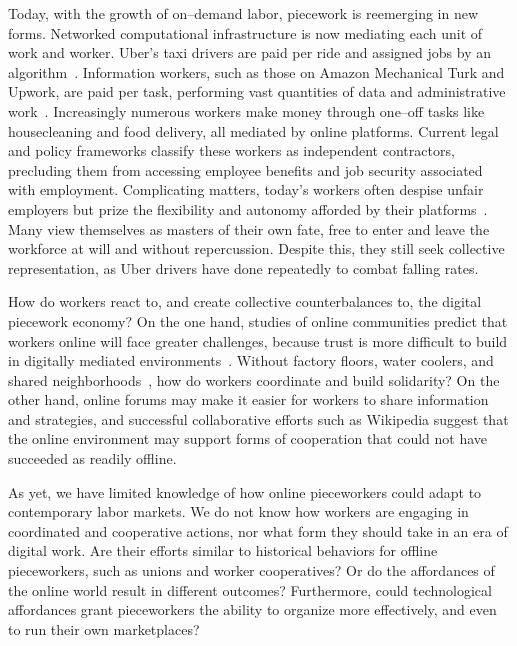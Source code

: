 \documentclass{article}
\newcommand{\topic}[1]{{\color{Blue}#1}} %
\begin{document}
\topic{Today, with the growth of on--demand labor, piecework is reemerging in new forms.}
Networked computational infrastructure is now mediating each unit of work and worker.
Uber's taxi drivers are paid per ride and assigned jobs by an algorithm~\cite{uberAlgorithm,hall2015analysis}.
Information workers, such as those on Amazon Mechanical Turk and Upwork, are paid per task, performing vast quantities of data and administrative work~\cite{martin2014being}.
Increasingly numerous workers make money through one--off tasks like housecleaning and food delivery, all mediated by online platforms.
Current legal and policy frameworks classify these workers as independent contractors, precluding them from accessing employee benefits and job security associated with employment.
Complicating matters, today's workers often despise unfair employers but prize the flexibility and autonomy afforded by their platforms~\cite{martin2014being}.
Many view themselves as masters of their own fate, free to enter and leave the workforce at will and without repercussion.
Despite this, they still seek collective representation, as Uber drivers have done repeatedly to combat falling rates.

\topic{How do workers react to, and create collective counterbalances to, the digital piecework economy?}
On the one hand, studies of online communities predict that workers online will face greater challenges, because
trust is more difficult to build in digitally mediated environments~\cite{successfulOnlineCommunities,kollock2005managing,cook2005cooperation}.
Without factory floors, water coolers, and shared neighborhoods~\cite{waterCooler},
how do workers coordinate and build solidarity?
On the other hand,
online forums may make it easier for workers to share information and strategies,
and successful collaborative efforts such as Wikipedia suggest that the online environment may support forms of cooperation that could not have succeeded as readily offline.

\topic{As yet,
we have limited knowledge of how online pieceworkers could adapt to contemporary labor markets.}
We do not know how workers are engaging in coordinated and cooperative actions,
nor what form they should take in an era of digital work.
Are their efforts similar to historical behaviors for offline pieceworkers,
such as unions and worker cooperatives?
Or do the affordances of the online world result in different outcomes?
Furthermore,
could technological affordances grant pieceworkers the ability to organize more effectively,
and even to run their own marketplaces?
\end{document}
